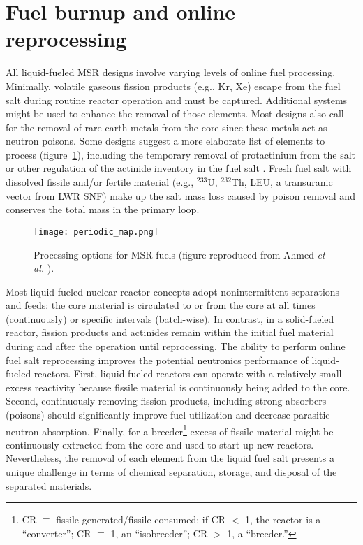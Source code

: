 \section{Fuel burnup and online reprocessing}
All liquid-fueled \gls{MSR} designs involve varying levels of online fuel 
processing. Minimally, volatile gaseous fission products (e.g., Kr, Xe) 
escape from the fuel salt during routine reactor operation and must be 
captured. Additional systems might be used to enhance the removal of those 
elements. Most designs also call for the removal of rare earth metals from 
the core since these metals act as neutron poisons. Some designs suggest a 
more elaborate list of elements to process (figure~\ref{fig:periodic_tab}), 
including the temporary removal of protactinium from the salt or other 
regulation of the actinide inventory in the fuel salt 
\cite{ahmad_neutronics_2015}. Fresh fuel salt with dissolved fissile and/or 
fertile material (e.g., $^{233}$U, $^{232}$Th, \gls{LEU}, a transuranic 
vector from \gls{LWR} \gls{SNF}) make up the salt mass loss caused by poison 
removal and conserves the total mass in the primary loop.
\begin{figure}[htp!] %
  \centering
  \texttt{[image: periodic\_map.png]}
  \caption{Processing options for \gls{MSR} fuels (figure reproduced from 
  Ahmed \emph{et al.} \cite{ahmad_neutronics_2015}).}
  \label{fig:periodic_tab}
\end{figure}

Most liquid-fueled nuclear reactor concepts adopt nonintermittent separations 
and feeds: the core material is circulated to or from the core at all times 
(continuously) or specific intervals (batch-wise). In contrast, in a 
solid-fueled reactor, fission products and actinides remain within the initial 
fuel material during and after the operation until reprocessing. The ability 
to perform online fuel salt reprocessing improves the potential neutronics 
performance of liquid-fueled reactors. First, liquid-fueled reactors can 
operate with a relatively small excess reactivity because fissile material is 
continuously being added to the core. Second, continuously 
removing fission products, including strong absorbers (poisons) should 
significantly improve fuel utilization and decrease parasitic neutron 
absorption. Finally, for a breeder\footnote{\gls{CR} 
$\equiv$ fissile generated/fissile consumed: if CR $<$ 1, the reactor is a 
``converter''; CR $\equiv$ 1, an ``isobreeder''; CR $>$ 1, a 
``breeder.''} excess of fissile material might be continuously extracted  
from the core and used to start up new reactors. Nevertheless, the removal of 
each element from the liquid fuel salt presents a unique challenge in terms of 
chemical separation, storage, and disposal of the separated materials.

